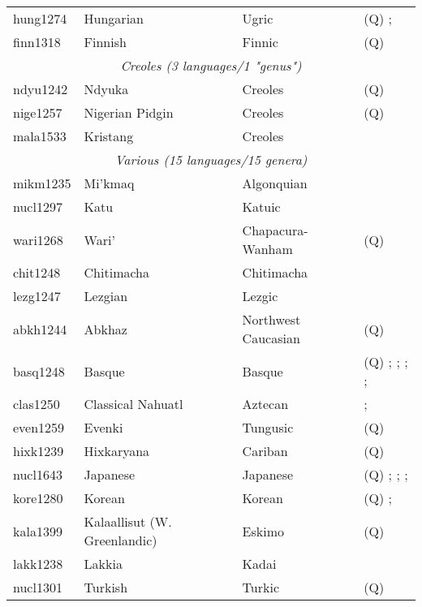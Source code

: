 \documentclass[A4paper]{article}
\begin{document}
\begin{longtable}{p{.11\linewidth}p{.2\linewidth}p{.24\linewidth}p{.35\linewidth}}
\midrule
hung1274	& Hungarian 	& Ugric 		& (Q) \citealp[269]{keneseietal1998}; \citealp[559]{hoehn2015unagr}\\
finn1318	& Finnish 	& Finnic 		& (Q) \citealp[277]{sulkalakarjalainen1992} \\
\midrule
\multicolumn{4}{c}{{\emph{Creoles (3 languages/1 "genus")}}}\\
\midrule
ndyu1242	& Ndyuka 	& Creoles 		 	& (Q) \citealp[224, 460, 466f.]{huttarhuttar1994}\\
nige1257	& Nigerian Pidgin & Creoles 		 	& (Q) \citealp[178, 181]{faraclas1996}\\
mala1533	& Kristang 	& Creoles 			& \citealp[86]{baxter1988}\\
\midrule
\multicolumn{4}{c}{{\emph{Various (15 languages/15 genera)}}}\\
\midrule
mikm1235	& Mi’kmaq 	& Algonquian			& \citealp[188]{pacifiqueetal1990}\\
nucl1297	& Katu 		& Katuic			& \citealp[28]{costello1969}\\
wari1268	& Wari' 	& Chapacura-Wanham		& (Q) \citealp[303, 310]{everettkern1997}\\
chit1248	& Chitimacha	& Chitimacha			& \citealp[333]{swadesh1967}\\
lezg1247	& Lezgian 	& Lezgic			& \citealp[259]{haspelmath1993}\\
abkh1244	& Abkhaz 	& Northwest Caucasian 		& (Q) \citealp[157, 159]{hewitt1989}\\
basq1248	& Basque 	& Basque 			& (Q) \citealp[210]{saltarelli1988}; \citealp[122]{trask2003}; \citealp[482, 501f.]{derijk2008}; \citealp[67]{areta2009}; \citealp{artiagoitia2012DP}\\
clas1250	& Classical Nahuatl & Aztecan	 		& \citealp[192--194]{andrews1975}; \citealp[ch. 17.3]{andrews2003}\\
even1259	& Evenki 	& Tungusic 			& (Q) \citealp[197, 199]{nedjalkov1997}\\
hixk1239	& Hixkaryana 	& Cariban 			& (Q) \citealp[131]{derbyshire1979}\\
nucl1643	& Japanese 	& Japanese 			& (Q) \citealp[254, 261]{hinds1988}; \citealp[780]{noguchi1997}; \citealp[sec. 3.2]{furuya2008}; \citealp{inokuma2009}\\
kore1280	& Korean 	& Korean 			& (Q) \citealp[284; 292]{sohn1994}; \citealp[151--154]{choi2014phd}\\
kala1399	& Kalaallisut (W. Greenlandic) 	& Eskimo	& (Q) \citealp[110, 253, 256f.]{fortescue1984}\\
lakk1238	& Lakkia	& Kadai		 		& \citealp[137]{fan2019}\\
nucl1301	& Turkish 	& Turkic 			& (Q) \citealp[288, 297f.]{kornfilt1997}\\
\bottomrule
\end{longtable}
\end{document}
